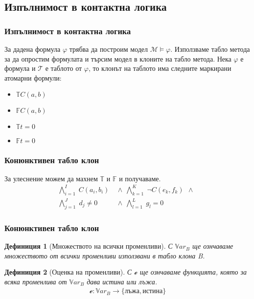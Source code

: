 \documentclass{beamer}
\newtheorem{defn}{Дефиниция}[section]
\newcommand{\curvedE}{\mathscr{e}}
\newcommand{\Var}{\mathbb{V}ar}
\newcommand{\signT}{\mathbb{T}}
\newcommand{\signF}{\mathbb{F}}
\begin{document}
\subsection{Изпълнимост в контактна логика}
\begin{frame}\frametitle{Изпълнимост в контактна логика}
За дадена формула $\varphi$ трябва да построим модел $\mathcal{M} \models \varphi$.
\newline
\newline
Използваме табло метода за да опростим формулата и търсим модел в клоните на табло метода.
\newline
\newline
		Нека $\varphi$ е формула и $\mathcal{T}$ е таблото от $\varphi$, то клонът на таблото има следните маркирани атомарни формули:
\begin{itemize}
	\item $\signT C(a, b)$
	\item $\signF C(a, b)$ 
	\item $\signT t = 0$
	\item $\signF t = 0$
\end{itemize}
\end{frame}

\begin{frame}\frametitle{Конюнктивен табло клон}
		За улеснение можем да махнем $\signT \textit{ и } \signF$ и получаваме.
\begin{align*}
			\bigwedge_{i=1}^{I} \; C(a_i, b_i) \:\: & \wedge \:\: 
			\bigwedge_{k=1}^{K} \; \neg C(e_k, f_k) \:\: \wedge \:\: \\
			\bigwedge_{j=1}^{J} \; d_j \neq 0 \:\: & \wedge \:\:
			\bigwedge_{l=1}^{L} \; g_l = 0 \:\:
\end{align*}%
\end{frame}

\begin{frame}\frametitle{Конюнктивен табло клон}
\begin{defn}[Множеството на всички променливи]
	С $\Var_B$ ще ознчаваме множеството от всички променливи използвани в табло клона B.
\end{defn}

\begin{defn}[Оценка на променливи]
	С $\curvedE$ ще ознчаваме функцията, която за всяка променлива от $\Var_B$ дава истина или лъжа.
		\begin{align*}
			\curvedE : \Var_B \rightarrow \{ \textbf{лъжа}, \textbf{истина}\}
		\end{align*}
\end{defn}
\end{frame}
\end{document}
